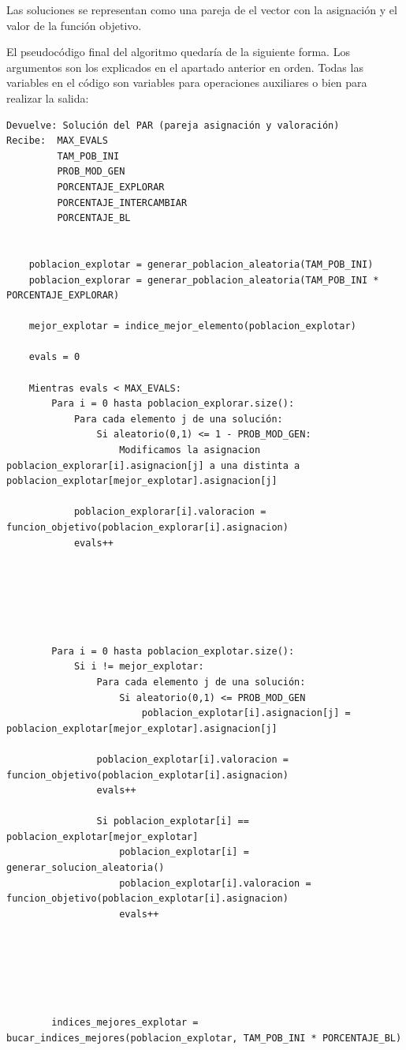 \documentclass[12pt, spanish]{article}
\begin{document}
Las soluciones se representan como una pareja de el vector con la asignación y el valor de la función objetivo.

El pseudocódigo final del algoritmo quedaría de la siguiente forma. Los argumentos son los explicados en el apartado anterior en orden. Todas las variables en el código son variables para operaciones auxiliares o bien para realizar la salida:

\begin{lstlisting}
Devuelve: Solución del PAR (pareja asignación y valoración)
Recibe:  MAX_EVALS
		 TAM_POB_INI
		 PROB_MOD_GEN
		 PORCENTAJE_EXPLORAR
		 PORCENTAJE_INTERCAMBIAR
		 PORCENTAJE_BL
		 
		 
	poblacion_explotar = generar_poblacion_aleatoria(TAM_POB_INI)
	poblacion_explorar = generar_poblacion_aleatoria(TAM_POB_INI * PORCENTAJE_EXPLORAR)
	
	mejor_explotar = indice_mejor_elemento(poblacion_explotar)
	
	evals = 0
	
	Mientras evals < MAX_EVALS:
		Para i = 0 hasta poblacion_explorar.size():
			Para cada elemento j de una solución:
				Si aleatorio(0,1) <= 1 - PROB_MOD_GEN:
					Modificamos la asignacion poblacion_explorar[i].asignacion[j] a una distinta a poblacion_explotar[mejor_explotar].asignacion[j]
					
			poblacion_explorar[i].valoracion = funcion_objetivo(poblacion_explorar[i].asignacion)
			evals++
		
		
		
		
		
		
		Para i = 0 hasta poblacion_explotar.size():
			Si i != mejor_explotar:
				Para cada elemento j de una solución:
					Si aleatorio(0,1) <= PROB_MOD_GEN
						poblacion_explotar[i].asignacion[j] = poblacion_explotar[mejor_explotar].asignacion[j]
						
				poblacion_explotar[i].valoracion = funcion_objetivo(poblacion_explotar[i].asignacion)
				evals++

				Si poblacion_explotar[i] == poblacion_explotar[mejor_explotar]
					poblacion_explotar[i] = generar_solucion_aleatoria()
					poblacion_explotar[i].valoracion = funcion_objetivo(poblacion_explotar[i].asignacion)
					evals++
					
					
				
				
			
			
		indices_mejores_explotar = bucar_indices_mejores(poblacion_explotar, TAM_POB_INI * PORCENTAJE_BL)
		

\end{lstlisting}
\end{document}
